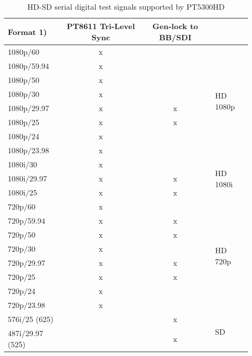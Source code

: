 \begin{table}[hbt]
\centering
\begin{tabular}{|l|c|c|p{0.5em}|}
\cline{1-3}
Format 1)			& PT8611 Tri-Level Sync	& Gen-lock to BB/SDI  \\
\cline{1-3}
\hline
1080p/60			& x	& 	& \multirow{8}{*}{\begin{sideways}{\tiny HD 1080p}\end{sideways}} \\
\cline{1-3}
1080p/59.94		& x	&		& \\
\cline{1-3}
1080p/50			&	x	&		& \\
\cline{1-3}
1080p/30			&	x	&		& \\
\cline{1-3}
1080p/29.97		&	x	&	x	& \\
\cline{1-3}
1080p/25			&	x	&	x	& \\
\cline{1-3}
1080p/24			&	x	&		& \\
\cline{1-3}
1080p/23.98		&	x	&		& \\
\hline
\hline
1080i/30			& x	& 	& \multirow{3}{2cm}{\begin{sideways}{\tiny HD 1080i}\end{sideways}} \\
\cline{1-3}
1080i/29.97 	& x & x & \\
\cline{1-3}
1080i/25 			& x & x & \\
\hline
\hline
720p/60				& x	& 	& \multirow{8}{*}{\begin{sideways}{\tiny HD 720p}\end{sideways}} \\
\cline{1-3}
720p/59.94		& x	&	x	& \\
\cline{1-3}
720p/50				&	x	&	x	& \\
\cline{1-3}
720p/30				&	x	&		& \\
\cline{1-3}
720p/29.97		&	x	&	x	& \\
\cline{1-3}
720p/25				&	x	&	x	& \\
\cline{1-3}
720p/24				&	x	&		& \\
\cline{1-3}
720p/23.98		&	x	&		& \\
\hline
\hline
576i/25 (625)			& 	& x	& \multirow{2}{*}{\begin{sideways}{\tiny SD}\end{sideways}} \\
\cline{1-3}
487i/29.97 (525)	&		&	x	& \\
\hline
\end{tabular}
\caption{HD-SD serial digital test signals supported by PT5300HD}
\label{tab:8612formats}
\end{table}

